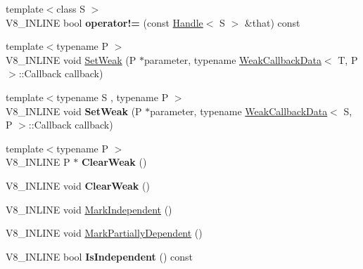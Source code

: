\begin{DoxyCompactItemize}
\item 
\hypertarget{classv8_1_1_persistent_base_acc30195c1ee4e1f801cab267e6855fd3}{}{\footnotesize template$<$class S $>$ }\\V8\+\_\+\+I\+N\+L\+I\+N\+E bool {\bfseries operator!=} (const \hyperlink{classv8_1_1_handle}{Handle}$<$ S $>$ \&that) const \label{classv8_1_1_persistent_base_acc30195c1ee4e1f801cab267e6855fd3}

\item 
{\footnotesize template$<$typename P $>$ }\\V8\+\_\+\+I\+N\+L\+I\+N\+E void \hyperlink{classv8_1_1_persistent_base_a1fb3293eff7a66068de13d152f73f308}{Set\+Weak} (P $\ast$parameter, typename \hyperlink{classv8_1_1_weak_callback_data}{Weak\+Callback\+Data}$<$ T, P $>$\+::Callback callback)
\item 
\hypertarget{classv8_1_1_persistent_base_a297e0c410e9496318187853e07bf8406}{}{\footnotesize template$<$typename S , typename P $>$ }\\V8\+\_\+\+I\+N\+L\+I\+N\+E void {\bfseries Set\+Weak} (P $\ast$parameter, typename \hyperlink{classv8_1_1_weak_callback_data}{Weak\+Callback\+Data}$<$ S, P $>$\+::Callback callback)\label{classv8_1_1_persistent_base_a297e0c410e9496318187853e07bf8406}

\item 
\hypertarget{classv8_1_1_persistent_base_a444d27c00650e3663348024df08cb121}{}{\footnotesize template$<$typename P $>$ }\\V8\+\_\+\+I\+N\+L\+I\+N\+E P $\ast$ {\bfseries Clear\+Weak} ()\label{classv8_1_1_persistent_base_a444d27c00650e3663348024df08cb121}

\item 
\hypertarget{classv8_1_1_persistent_base_afe515daead108cceb1699b54051df13b}{}V8\+\_\+\+I\+N\+L\+I\+N\+E void {\bfseries Clear\+Weak} ()\label{classv8_1_1_persistent_base_afe515daead108cceb1699b54051df13b}

\item 
V8\+\_\+\+I\+N\+L\+I\+N\+E void \hyperlink{classv8_1_1_persistent_base_aed12b0a54bc5ade1fb44e3bdb3a1fe74}{Mark\+Independent} ()
\item 
V8\+\_\+\+I\+N\+L\+I\+N\+E void \hyperlink{classv8_1_1_persistent_base_a4a876d30dda0dfb812e82bb240e4686e}{Mark\+Partially\+Dependent} ()
\item 
\hypertarget{classv8_1_1_persistent_base_a2ed93b6be1b27c299906935ef35d2114}{}V8\+\_\+\+I\+N\+L\+I\+N\+E bool {\bfseries Is\+Independent} () const \label{classv8_1_1_persistent_base_a2ed93b6be1b27c299906935ef35d2114}


\end{DoxyCompactItemize}
